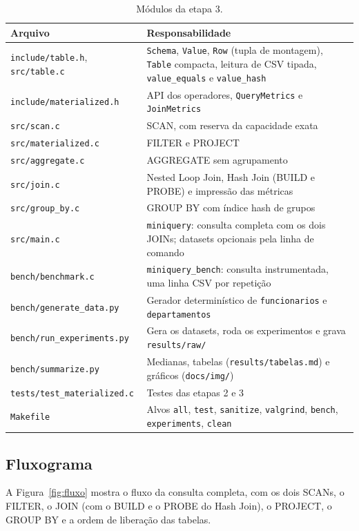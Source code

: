 \documentclass[11pt,a4paper]{article}
\begin{document}
\begin{table}[H]
\centering
\small
\begin{tabular}{@{}p{5.0cm}p{11.4cm}@{}}
\toprule
Arquivo & Responsabilidade \\
\midrule
\texttt{include/table.h}, \texttt{src/table.c} & \texttt{Schema}, \texttt{Value}, \texttt{Row} (tupla de montagem), \texttt{Table} compacta, leitura de CSV tipada, \texttt{value\_equals} e \texttt{value\_hash} \\
\texttt{include/materialized.h} & API dos operadores, \texttt{QueryMetrics} e \texttt{JoinMetrics} \\
\texttt{src/scan.c} & SCAN, com reserva da capacidade exata \\
\texttt{src/materialized.c} & FILTER e PROJECT \\
\texttt{src/aggregate.c} & AGGREGATE sem agrupamento \\
\texttt{src/join.c} & Nested Loop Join, Hash Join (BUILD e PROBE) e impressão das métricas \\
\texttt{src/group\_by.c} & GROUP BY com índice hash de grupos \\
\texttt{src/main.c} & \texttt{miniquery}: consulta completa com os dois JOINs; datasets opcionais pela linha de comando \\
\texttt{bench/benchmark.c} & \texttt{miniquery\_bench}: consulta instrumentada, uma linha CSV por repetição \\
\texttt{bench/generate\_data.py} & Gerador determinístico de \texttt{funcionarios} e \texttt{departamentos} \\
\texttt{bench/run\_experiments.py} & Gera os datasets, roda os experimentos e grava \texttt{results/raw/} \\
\texttt{bench/summarize.py} & Medianas, tabelas (\texttt{results/tabelas.md}) e gráficos (\texttt{docs/img/}) \\
\texttt{tests/test\_materialized.c} & Testes das etapas 2 e 3 \\
\texttt{Makefile} & Alvos \texttt{all}, \texttt{test}, \texttt{sanitize}, \texttt{valgrind}, \texttt{bench}, \texttt{experiments}, \texttt{clean} \\
\bottomrule
\end{tabular}
\caption{Módulos da etapa 3.}
\label{tab:modulos}
\end{table}

\subsection{Fluxograma}
A Figura~\ref{fig:fluxo} mostra o fluxo da consulta completa, com os dois SCANs, o FILTER, o JOIN (com o BUILD e o PROBE do Hash Join), o PROJECT, o GROUP BY e a ordem de liberação das tabelas.
\end{document}
